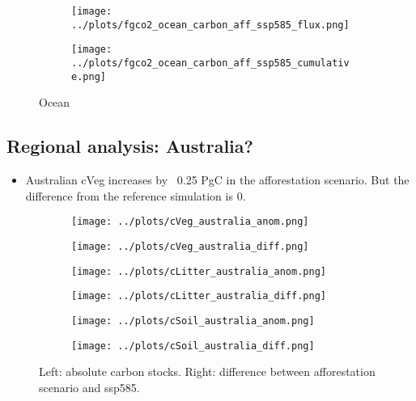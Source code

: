 \documentclass[]{article}
\begin{document}
\begin{figure}
    \centering
    \begin{subfigure}[b]{0.4\linewidth}
        \texttt{[image: ../plots/fgco2\_ocean\_carbon\_aff\_ssp585\_flux.png]}
    \end{subfigure}
    \begin{subfigure}[b]{0.4\linewidth}
        \texttt{[image: ../plots/fgco2\_ocean\_carbon\_aff\_ssp585\_cumulative.png]}
    \end{subfigure}
    \caption{Ocean}
    \label{fig:ocean_carbon}
\end{figure}


\subsection{Regional analysis: Australia?}

\begin{itemize}
    \item Australian cVeg increases by ~0.25 PgC in the afforestation scenario. But the difference from the reference simulation is 0.
\end{itemize}

\begin{figure}[H]
    \centering
    \begin{subfigure}[b]{0.4\linewidth}
        \texttt{[image: ../plots/cVeg\_australia\_anom.png]}
    \end{subfigure}
    \begin{subfigure}[b]{0.4\linewidth}
        \texttt{[image: ../plots/cVeg\_australia\_diff.png]}
    \end{subfigure}
    \begin{subfigure}[b]{0.4\linewidth}
        \texttt{[image: ../plots/cLitter\_australia\_anom.png]}
    \end{subfigure}
    \begin{subfigure}[b]{0.4\linewidth}
        \texttt{[image: ../plots/cLitter\_australia\_diff.png]}
    \end{subfigure}
    \begin{subfigure}[b]{0.4\linewidth}
        \texttt{[image: ../plots/cSoil\_australia\_anom.png]}
    \end{subfigure}
    \begin{subfigure}[b]{0.4\linewidth}
        \texttt{[image: ../plots/cSoil\_australia\_diff.png]}
    \end{subfigure}
    \caption{Left: absolute carbon stocks. Right: difference between afforestation scenario and ssp585.}
    \label{fig:aus_region}
\end{figure}
\end{document}
